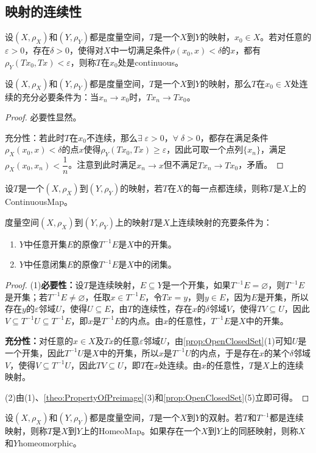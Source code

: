 \subsection{映射的连续性}
\begin{definition}
	设$(X,\rho_X)$和$(Y,\rho_Y)$都是度量空间，$T$是一个$X$到$Y$的映射，$x_0\in X$。若对任意的$\varepsilon>0$，存在$\delta>0$，使得对$X$中一切满足条件$\rho(x_0,x)<\delta$的$x$，都有$\rho_Y(Tx_0,Tx)<\varepsilon$，则称$T$在$x_0$处是\gls{continuous}。
\end{definition}
\begin{theorem}
	设$(X,\rho_X)$和$(Y,\rho_Y)$都是度量空间，$T$是一个$X$到$Y$的映射，那么$T$在$x_0\in X$处连续的充分必要条件为：当$x_n\to x_0$时，$Tx_n\to Tx_0$。
\end{theorem}
\begin{proof}
	必要性显然。\par
	充分性：若此时$T$在$x_0$不连续，那么$\exists\;\varepsilon>0$，$\forall\;\delta>0$，都存在满足条件$\rho_X(x_0,x)<\delta$的点$x$使得$\rho_Y(Tx_0,Tx)\geqslant\varepsilon$，因此可取一个点列$\{x_n\}$，满足$\rho_X(x_0,x_n)<\dfrac{1}{n}$。注意到此时满足$x_n\to x$但不满足$Tx_n\to Tx_0$，矛盾。
\end{proof}
\begin{definition}
	设$T$是一个$(X,\rho_X)$到$(Y,\rho_Y)$的映射，若$T$在$X$的每一点都连续，则称$T$是$X$上的\gls{ContinuousMap}。
\end{definition}
\begin{theorem}\label{theo:ContinousMapO2OC2C}
	度量空间$(X,\rho_X)$到$(Y,\rho_Y)$上的映射$T$是$X$上连续映射的充要条件为：
	\begin{enumerate}
		\item $Y$中任意开集$E$的原像$T^{-1}E$是$X$中的开集。
		\item $Y$中任意闭集$E$的原像$T^{-1}E$是$X$中的闭集。
	\end{enumerate}
\end{theorem}
\begin{proof}
	(1)\textbf{必要性：}设$T$是连续映射，$E\subseteq Y$是一个开集，如果$T^{-1}E=\varnothing$，则$T^{-1}E$是开集；若$T^{-1}E\ne\varnothing$，任取$x\in T^{-1}E$，令$Tx=y$，则$y\in E$，因为$E$是开集，所以存在$y$的$\varepsilon$邻域$U$，使得$U\subseteq E$，由$T$的连续性，存在$x$的$\delta$邻域$V$，使得$TV\subseteq U$，因此$V\subseteq T^{-1}U\subseteq T^{-1}E$，即$x$是$T^{-1}E$的内点。由$x$的任意性，$T^{-1}E$是$X$中的开集。\par
	\textbf{充分性：}对任意的$x\in X$及$Tx$的任意$\varepsilon$邻域$U$，由\cref{prop:OpenClosedSet}(1)可知$U$是一个开集，因此$T^{-1}U$是$X$中的开集，所以$x$是$T^{-1}U$的内点，于是存在$x$的某个$\delta$邻域$V$，使得$V\subseteq T^{-1}U$，因此$TV\subseteq U$，即$T$在$x$处连续。由$x$的任意性，$T$是$X$上的连续映射。\par
	(2)由(1)、\cref{theo:PropertyOfPreimage}(3)和\cref{prop:OpenClosedSet}(5)立即可得。
\end{proof}
\begin{definition}
	设$(X,\rho_X)$和$(Y,\rho_Y)$都是度量空间，$T$是一个$X$到$Y$的双射。若$T$和$T^{-1}$都是连续映射，则称$T$是$X$到$Y$上的\gls{HomeoMap}。如果存在一个$X$到$Y$上的同胚映射，则称$X$和$Y$\gls{homeomorphic}。
\end{definition}

